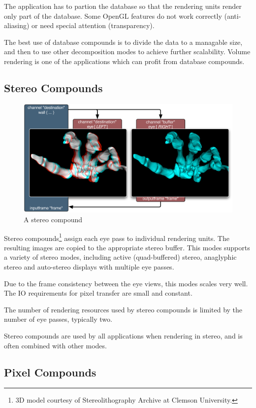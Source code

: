 \documentclass[10pt,a4]{scrartcl}
\begin{document}
The application has to partion the database so that the rendering units
render only part of the database. Some OpenGL features do not work
correctly (anti-aliasing) or need special attention (transparency).

The best use of database compounds is to divide the data to a managable
size, and then to use other decomposition modes to achieve further
scalability. Volume rendering is one of the applications which can
profit from database compounds.


\subsection{Stereo Compounds}

\begin{figure}
  \includegraphics[width=.618\textwidth]{images/EYE.pdf}
  {\caption{\small A stereo compound}}
\end{figure}
Stereo compounds\footnote{3D model courtesy of Stereolithography Archive
  at Clemson University.} assign each eye pass to individual rendering
units. The resulting images are copied to the appropriate stereo
buffer. This modes supports a variety of stereo modes, including active
(quad-buffered) stereo, anaglyphic stereo and auto-stereo displays with
multiple eye passes.

Due to the frame consistency between the eye views, this modes scales
very well. The IO requirements for pixel transfer are small and
constant.

The number of rendering resources used by stereo compounds is limited by
the number of eye passes, typically two. 

Stereo compounds are used by all applications when rendering in stereo,
and is often combined with other modes.


\subsection{Pixel Compounds}
\end{document}
